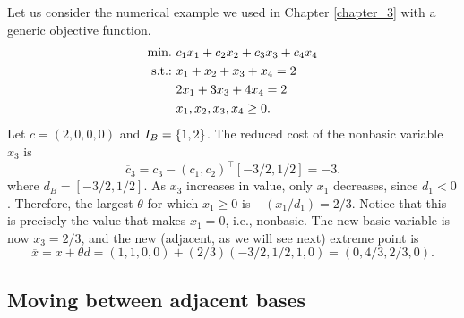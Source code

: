 Let us consider the numerical example we used in Chapter \ref{chapter_3} with a generic objective function. 
%
\begin{align*}
	\mathop{\text{min.~}} & c_1x_1 + c_2x_2 + c_3x_3 + c_4x_4 \\	
	\mathop{\text{s.t.:~}} & x_1 + x_2 + x_3 + x_4 = 2 \\
	& 2x_1 + 3x_3 + 4x_4 = 2 \\
	& x_1, x_2 ,x_3, x_4 \geq 0.  
\end{align*}
%
Let $c = (2,0,0,0)$ and $I_B=\left\{ 1,2 \right \} $. The reduced cost of the nonbasic variable $x_3$ is 
%
\begin{equation*}
	\overline{c}_3 = c_3 - (c_1, c_2)^\top [-3/2, 1/2] = -3.	
\end{equation*}
%
where $d_B = [-3/2, 1/2]$. As $x_3$ increases in value, only $x_1$ decreases, since $d_1 < 0$. Therefore, the largest $\overline{\theta}$ for which $x_1\geq 0$ is $-(x_1/d_1)= 2/3$. Notice that this is precisely the value that makes $x_1 = 0$, i.e., nonbasic. The new basic variable is now $x_3 = 2/3$, and the new (adjacent, as we will see next) extreme point is 
%
\begin{equation*}
	\overline{x} = x + \theta d = (1,1,0,0) + (2/3)(-3/2, 1/2, 1, 0) = (0,4/3,2/3,0).	
\end{equation*}



\subsection{Moving between adjacent bases}

